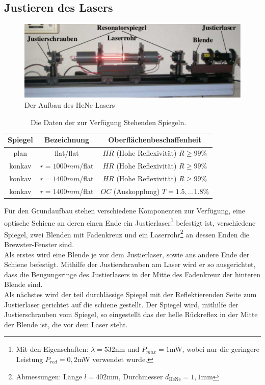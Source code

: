 \subsection{Justieren des Lasers}
\begin{figure}[h!]
\centering
\includegraphics[scale=0.75]{../Grafiken/Aufbau.pdf}
\caption{Der Aufbau des HeNe-Lasers\cite{V61}}\label{Aufbau}
\end{figure}
\begin{table}[h!]
\centering
\begin{tabular}{c c c}
Spiegel & Bezeichnung & Oberflächenbeschaffenheit \\\hline
plan & flat/flat & $HR$ (Hohe Reflexivität) $R\ge 99\%$\\
konkav & $r=1000mm$/flat & $HR$ (Hohe Reflexivität) $R\ge 99\%$\\
konkav & $r=1400mm$/flat & $HR$ (Hohe Reflexivität) $R\ge 99\%$\\
konkav & $r=1400mm$/flat & $OC$ (Auskopplung) $T=1.5,...1.8\% $
\end{tabular}
\caption{Die Daten der zur Verfügung Stehenden Spiegeln.\cite{V61}\label{Eigenschaften}}
\end{table}
Für den Grundaufbau stehen verschiedene Komponenten zur Verfügung, eine optische Schiene an deren einen Ende ein Justierlaser\footnote{Mit den Eigenschaften: $\lambda=532$nm und $P_{max}=1$mW, wobei nur die geringere Leistung $P_{red}=0,2$mW verwendet wurde.} befestigt ist, verschiedene Spiegel, zwei Blenden mit Fadenkreuz und ein Laserrohr\footnote{Abmessungen: Länge $l=402$mm, Durchmesser $d_{\text{HeNe}}=1,1$mm} an dessen Enden die Brewster-Fenster sind.\\ 
Als erstes wird eine Blende je vor dem Justierlaser, sowie ans andere Ende der Schiene befestigt. Mithilfe der Justiershrauben am Laser wird er so ausgerichtet, dass die Beugungsringe des Justierlasers in der Mitte des Fadenkreuz der hinteren Blende sind.\\
Als nächstes wird der teil durchlässige Spiegel mit der Reflektierenden Seite zum Justierlaser gerichtet auf die schiene gestellt. Der Spiegel wird, mithilfe der Justierschrauben vom Spiegel, so eingestellt das der helle Rückreflex in der Mitte der Blende ist, die vor dem Laser steht.\\ 

